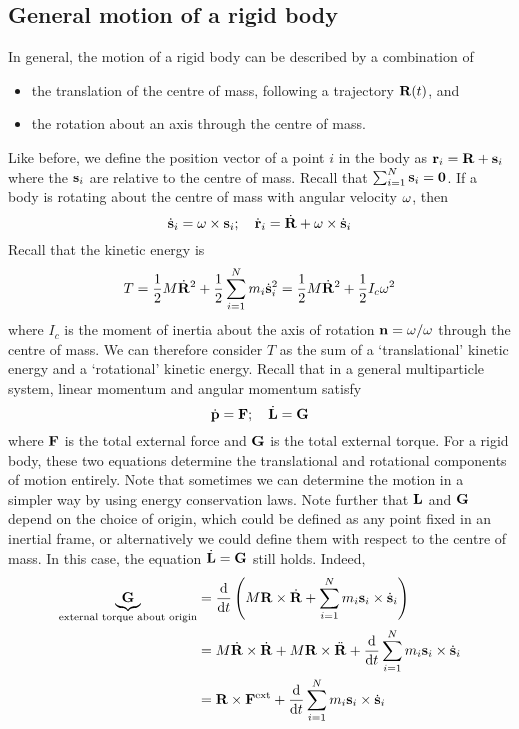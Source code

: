 \subsection{General motion of a rigid body}
In general, the motion of a rigid body can be described by a combination of
\begin{itemize}
	\item the translation of the centre of mass, following a trajectory \(\vb R(t)\), and
	\item the rotation about an axis through the centre of mass.
\end{itemize}
Like before, we define the position vector of a point \(i\) in the body as \(\vb r_i = \vb R + \vb s_i\) where the \(\vb s_i\) are relative to the centre of mass.
Recall that \(\sum_{i=1}^N \vb s_i = \vb 0\).
If a body is rotating about the centre of mass with angular velocity \(\vb\omega\), then
\[
	\dot{\vb s}_i = \vb\omega \times \vb s_i;\quad \dot{\vb r}_i = \dot{\vb R} + \vb\omega \times \dot{\vb s}_i
\]
Recall that the kinetic energy is
\[
	T = \frac{1}{2}M \dot{\vb R}^2 + \frac{1}{2}\sum_{i=1}^N m_i \dot{\vb s}_i^2 = \frac{1}{2}M \dot{\vb R}^2 + \frac{1}{2}I_c \omega^2
\]
where \(I_c\) is the moment of inertia about the axis of rotation \(\vb n = \vb\omega / \omega\) through the centre of mass.
We can therefore consider \(T\) as the sum of a `translational' kinetic energy and a `rotational' kinetic energy.
Recall that in a general multiparticle system, linear momentum and angular momentum satisfy
\[
	\dot{\vb p} = \vb F;\quad \dot{\vb L} = \vb G
\]
where \(\vb F\) is the total external force and \(\vb G\) is the total external torque.
For a rigid body, these two equations determine the translational and rotational components of motion entirely.
Note that sometimes we can determine the motion in a simpler way by using energy conservation laws.
Note further that \(\vb L\) and \(\vb G\) depend on the choice of origin, which could be defined as any point fixed in an inertial frame, or alternatively we could define them with respect to the centre of mass.
In this case, the equation \(\dot{\vb L} = \vb G\) still holds.
Indeed,
\begin{align*}
	\underbrace{\vb G}_{\text{external torque about origin}} & = \dv{t} \left( M \vb R \times \dot{\vb R} + \sum_{i=1}^N m_i \vb s_i \times \dot{\vb s}_i \right)                      \\
	                                                         & = M \dot{\vb R} \times \dot{\vb R} + M \vb R \times \ddot{\vb R} + \dv{t} \sum_{i=1}^N m_i \vb s_i \times \dot{\vb s}_i \\
	                                                         & = \vb R \times \vb F^\text{ext} + \dv{t} \sum_{i=1}^N m_i \vb s_i \times \dot{\vb s}_i
\end{align*}
